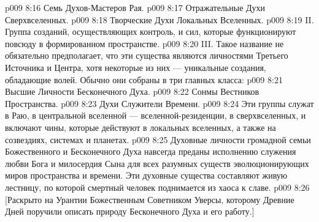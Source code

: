 \vs p009 8:16 \bibnobreakspace Семь Духов\hyp{}Мастеров Рая.
\vs p009 8:17 \bibnobreakspace Отражательные Духи Сверхвселенных.
\vs p009 8:18 \bibnobreakspace Творческие Духи Локальных Вселенных.
\vs p009 8:19 \pc II.  Группа созданий, осуществляющих контроль, и сил, которые функционируют повсюду в формированном пространстве.
\vs p009 8:20 \pc III.  Такое название не обязательно предполагает, что эти существа являются личностями Третьего Источника и Центра, хотя некоторые из них --- уникальные создания, обладающие волей. Обычно они собраны в три главных класса:
\vs p009 8:21 \bibnobreakspace Высшие Личности Бесконечного Духа.
\vs p009 8:22 \bibnobreakspace Сонмы Вестников Пространства.
\vs p009 8:23 \bibnobreakspace Духи Служители Времени.
\vs p009 8:24 Эти группы служат в Раю, в центральной вселенной --- вселенной\hyp{}резиденции, в сверхвселенных, и включают чины, которые действуют в локальных вселенных, а также на созвездиях, системах и планетах.
\vs p009 8:25 Духовные личности громадной семьи Божественного и Бесконечного Духа навсегда преданы исполнению служения любви Бога и милосердия Сына для всех разумных существ эволюционирующих миров пространства и времени. Эти духовные существа составляют живую лестницу, по которой смертный человек поднимается из хаоса к славе.
\vsetoff
\vs p009 8:26 [Раскрыто на Урантии Божественным Советником Уверсы, которому Древние Дней поручили описать природу Бесконечного Духа и его работу.]
